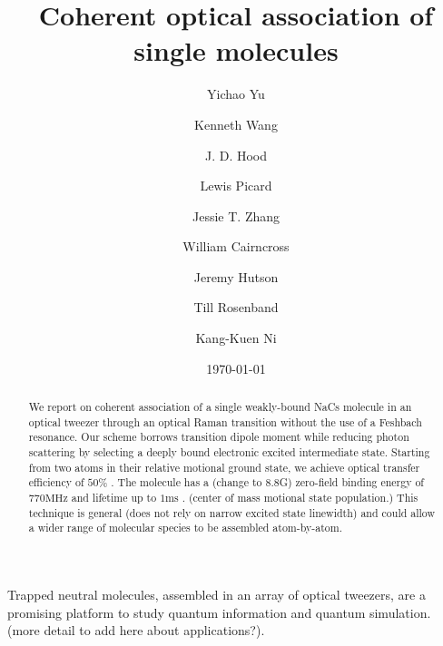 \documentclass[aps,prl,twocolumn,groupedaddress]{revtex4-1}
\newcommand{\todo}[1]{}
\begin{document}
\title{Coherent optical association of single molecules}
\author{Yichao Yu}
\author{Kenneth Wang}
\author{J. D. Hood}
\author{Lewis Picard}
\author{Jessie T. Zhang}
\author{William Cairncross}
\author{Jeremy Hutson}
\author{Till Rosenband}
\author{Kang-Kuen Ni}

\date{\today}

\begin{abstract}
  We report on coherent association of a single weakly-bound NaCs molecule in an optical tweezer
  through an optical Raman transition without the use of a Feshbach resonance. Our scheme borrows transition dipole moment while reducing photon scattering by selecting a deeply bound electronic excited intermediate state.
  Starting from two atoms in their relative motional ground state,
  we achieve optical transfer efficiency of $50 \%$ \todo{number}.
  The molecule has a (change to 8.8G) zero-field binding energy of $770 \mathrm{MHz}$ \todo{number}
  and lifetime up to $1 \mathrm{ms}$ \todo{number}. (center of mass motional state population.)
  This  technique is general (does not rely on narrow excited state linewidth) and could allow a wider range of molecular species to be assembled atom-by-atom.
\end{abstract}


\maketitle


Trapped neutral molecules, assembled in an array of optical tweezers, are a promising platform to study quantum information and quantum simulation. (more detail to add here about applications?).
\end{document}

